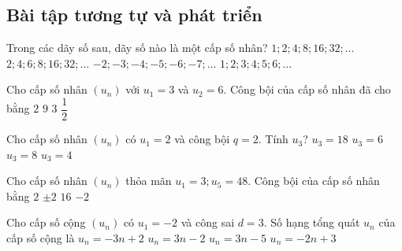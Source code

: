 \subsection{Bài tập tương tự và phát triển}
\begin{ex}%
	Trong các dãy số sau, dãy số nào là một cấp số nhân?
	\choice
		{\True $1;2;4;8;16;32;\ldots$}
		{$2;4;6;8;16;32;\ldots$}
		{ $-2;-3;-4;-5;-6;-7;\ldots$}
		{$1;2;3;4;5;6;\ldots$}
\end{ex}
\begin{ex}%
	Cho cấp số nhân $\left(u_n \right)$ với $u_1=3$ và $u_2=6$. Công bội của cấp số nhân đã cho bằng
	\choice
		{\True $2$}
		{$9$}
		{$3$}
		{$\dfrac{1}{2}$}
\end{ex}
\begin{ex}%
	Cho cấp số nhân $\left(u_n \right)$ có $u_1=2$ và công bội $q=2$. Tính $u_3$?
	\choice
		{ $u_3=18$}
		{$u_3=6$}
		{\True $u_3=8$}
		{$u_3=4$}
\end{ex}
\begin{ex}%
	Cho cấp số nhân $\left(u_n \right)$ thỏa mãn $u_1=3;u_5=48$. Công bội của cấp số nhân bằng
	\choice
		{$2$}
		{\True $\pm 2$ }
		{$16$}
		{$-2$}
\end{ex}
\begin{ex}%
	Cho cấp số cộng $\left(u_n \right)$ có $u_1=-2$ và công sai $d=3$. Số hạng tổng quát $u_n$ của cấp số cộng là
	\choice
		{$u_n=-3n+2$ }
		{$u_n=3n-2$}
		{\True $u_n=3n-5$}
		{$u_n=-2n+3$}
\end{ex}
